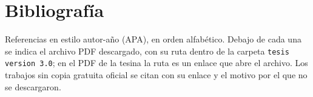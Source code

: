 \documentclass[11pt,a4paper,oneside]{report}
\newcommand{\carpeta}[1]{\nolinkurl{#1}}
\begin{document}








\chapter*{Bibliografía}
Referencias en estilo autor-año (APA), en orden alfabético. Debajo de cada una se indica el
archivo PDF descargado, con su ruta dentro de la carpeta \carpeta{tesis version 3.0}; en el
PDF de la tesina la ruta es un enlace que abre el archivo. Los trabajos sin copia gratuita
oficial se citan con su enlace y el motivo por el que no se descargaron.
\renewcommand{\bibsection}{}
{\raggedright}


\end{document}
